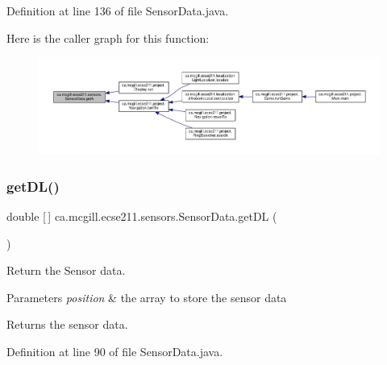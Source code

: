 Definition at line 136 of file Sensor\+Data.\+java.

Here is the caller graph for this function\+:
\nopagebreak
\begin{figure}[H]
\begin{center}
\leavevmode
\includegraphics[width=350pt]{classca_1_1mcgill_1_1ecse211_1_1sensors_1_1_sensor_data_a7ad543db5c907b4bd3329dbb34b4e9d9_icgraph}
\end{center}
\end{figure}
\mbox{\label{classca_1_1mcgill_1_1ecse211_1_1sensors_1_1_sensor_data_a4e0eabd547726c90bd0b7252557d7ad7}} 
\subsubsection{\texorpdfstring{get\+D\+L()}{getDL()}}
{\footnotesize\ttfamily double \mbox{[}$\,$\mbox{]} ca.\+mcgill.\+ecse211.\+sensors.\+Sensor\+Data.\+get\+DL (\begin{DoxyParamCaption}{ }\end{DoxyParamCaption})}

Return the Sensor data.


\begin{DoxyParams}{Parameters}
{\em position} & the array to store the sensor data \\
\hline
\end{DoxyParams}
\begin{DoxyReturn}{Returns}
the sensor data. 
\end{DoxyReturn}


Definition at line 90 of file Sensor\+Data.\+java.

